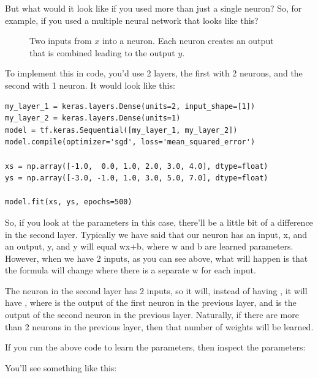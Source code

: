 But what would it look like if you used more than just a single neuron? So, for example, if you used a multiple neural network that looks like this?

\begin{figure}
    \caption{Two inputs from $x$ into a neuron. Each neuron creates an output that is combined leading to the output $y$.}
\end{figure} 


To implement this in code, you'd use 2 layers, the first with 2 neurons, and the second with 1 neuron. It would look like this:


\begin{lstlisting}
my_layer_1 = keras.layers.Dense(units=2, input_shape=[1])
my_layer_2 = keras.layers.Dense(units=1)
model = tf.keras.Sequential([my_layer_1, my_layer_2])
model.compile(optimizer='sgd', loss='mean_squared_error')

xs = np.array([-1.0,  0.0, 1.0, 2.0, 3.0, 4.0], dtype=float)
ys = np.array([-3.0, -1.0, 1.0, 3.0, 5.0, 7.0], dtype=float)

model.fit(xs, ys, epochs=500)
\end{lstlisting}


So, if you look at the parameters in this case, there’ll be a little bit of a difference in the second layer. Typically we have said that our neuron has an input, x, and an output, y, and y will equal wx+b, where w and b are learned parameters. However, when we have 2 inputs, as you can see above, what will happen is that the formula will change where there is a separate w for each input. 



The neuron in the second layer has 2 inputs, so it will, instead of having , it will have , where  is the output of the first neuron in the previous layer, and  is the output of the second neuron in the previous layer. Naturally, if there are more than 2 neurons in the previous layer, then that number of weights will be learned.

If you run the above code to learn the parameters, then inspect the parameters:


You'll see something like this:


